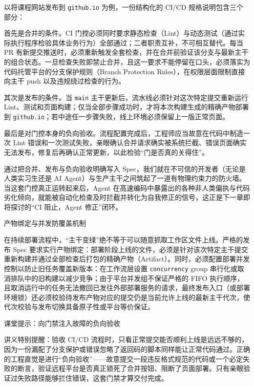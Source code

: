 \documentclass[UTF8,a4paper,11pt,fontset=fandol]{ctexart}
\begin{document}
以将课程网站发布到 \texttt{github.io} 为例，一份结构化的 CI/CD 规格说明包含三个部分：

首先是合并的条件。CI 门控必须同时要求静态检查（Lint）与动态测试（通过实际执行程序检验具体业务行为）全部通过；二者职责互补，不可相互替代。每当 PR 有新提交推送时，必须重新触发全套检查，并在合并前验证该分支与最新主干的组合状态。一旦检查失败即禁止合并，且这一要求不能停留在口头，必须落实为代码托管平台的分支保护规则（Branch Protection Rules），在权限层面限制直接向主干 push 以及违规绕过检查的行为。

其次是发布的条件。当 \texttt{main} 主干更新后，流水线必须针对这次特定提交重新运行 Lint、测试和页面构建；仅当全部步骤成功时，才将本次构建生成的精确产物部署到 \texttt{github.io}；若中途任一步骤失败，线上环境必须保留上一版正常页面。

最后是对门控本身的负向验收。流程配置完成后，工程师应当故意在代码中制造一次 Lint 错误和一次测试失败，亲眼确认合并请求确实被系统拦截、错误页面确实无法发布，修复后再确认正常更新，以此检验“门是否真的关得住”。

通过把合并、发布与负向验收明确写入 Spec，我们就在不可信的开发者（无论是人类实习生还是 AI Agent）与生产主干之间筑起了一道有物理约束力的防火墙。当这套门控真正运转起来后，Agent 在高速编码中暴露出的各种非人类偏执与代码劣化倾向，就能被自动化检查及时拦截并转化为自我修正的信号，这正是下一章即将探讨的“CI 阻止，Agent 修正”闭环。

\begin{importantbox}{产物绑定与并发防覆盖机制}

在持续部署流程中，“主干变绿”绝不等于可以随意抓取工作区文件上线。严格的发布 Spec 要求实行产物绑定：部署阶段上线的文件，必须是针对该次特定主干提交重新构建并通过全部检查后打包的精确产物（Artifact）。同时，必须配置部署并发控制以防止旧任务覆盖新版本：在工作流层设置 \texttt{concurrency} group 串行化或取消排队中的旧构建以减少竞争；由于平台并发组不保证严格的 FIFO 执行顺序，且取消运行中的任务无法撤回已发往外部部署服务的请求，最终发布入口（或部署环境锁）还必须校验待发布产物对应的提交仍是当前允许上线的最新主干代次，使代次校验与发布切换具备原子性或平台等价保证。

\end{importantbox}

\begin{knowledgebox}{课堂提示：向门禁注入故障的负向验收}

讲义特别提醒：验收 CI/CD 流程时，只看正常提交能否顺利上线是远远不够的，因为一份漏配了分支保护或错误忽略了返回码的脚本同样能让正常代码通过。正确的工程直觉是进行“负向验收”——故意提交一段违反格式规范的代码或一个必定失败的断言，验证远程平台是否真正锁死了合并按钮、阻断了页面部署。只有亲眼验证过失败路径能够拦住错误，这套门禁才算交付完成。

\end{knowledgebox}
\end{document}
